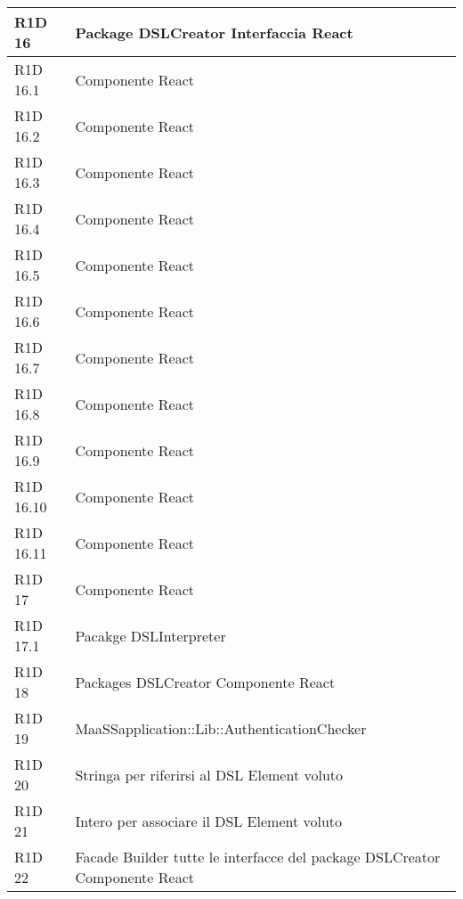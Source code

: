 \begin{center}
\begin{longtable}{ | l | p{8cm} |}
	R1D 16 & Package DSLCreator \newline Interfaccia React \\ \hline

	R1D 16.1 & Componente React \\ \hline

	R1D 16.2 & Componente React \\ \hline

	R1D 16.3 & Componente React \\ \hline	

	R1D 16.4 & Componente React \\ \hline

	R1D 16.5 & Componente React \\ \hline

	R1D 16.6 & Componente React \\ \hline

	R1D 16.7 & Componente React \\ \hline

	R1D 16.8 & Componente React \\ \hline

	R1D 16.9 & Componente React \\ \hline

	R1D 16.10 & Componente React \\ \hline

	R1D 16.11 & Componente React \\ \hline

	R1D 17 & Componente React \\ \hline 

	R1D 17.1 & Pacakge DSLInterpreter \\ \hline

	R1D 18 & Packages DSLCreator \newline Componente React \\ \hline

	R1D 19 & MaaSSapplication::Lib::AuthenticationChecker \\ \hline

	R1D 20 & Stringa per riferirsi al DSL Element voluto \\ \hline
 
	R1D 21 & Intero per associare il DSL Element voluto \\ \hline

	R1D 22 & Facade \newline Builder \newline tutte le interfacce del package DSLCreator \newline Componente React \\ \hline


\end{longtable}
\end{center}
